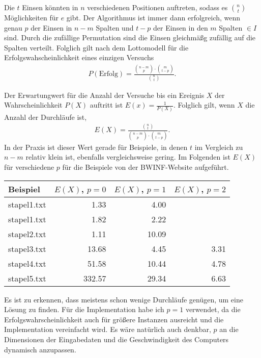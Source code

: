 \documentclass[a4paper,10pt,ngerman]{scrartcl}
\begin{document}
Die $t$ Einsen könnten in $n$ verschiedenen Positionen auftreten, sodass es $\binom{n}{t}$ Möglichkeiten für $e$ gibt. Der Algorithmus ist immer dann erfolgreich, wenn genau $p$ der Einsen in $n-m$ Spalten und $t-p$ der Einsen in den $m$ Spalten $\in I$ sind. Durch die zufällige Permutation sind die Einsen gleichmäßg zufällig auf die Spalten verteilt. Folglich gilt nach dem Lottomodell für die Erfolgswahscheinlichkeit eines einzigen Versuchs
\begin{align*}
    P(\text{Erfolg}) = \frac{\binom{n-m}{p} \cdot \binom{m}{t-p}}{\binom{n}{t}}.
\end{align*}

Der Erwartungwert für die Anzahl der Versuche bis ein Ereignis $X$ der Wahrscheinlichkeit $P(X)$ auftritt ist $E(x) = \frac{1}{P(X)}$.
Folglich gilt, wenn $X$ die Anzahl der Durchläufe ist,
\begin{align*}
    E(X) = \frac{\binom{n}{t}}{\binom{n-m}{p} \cdot \binom{m}{t-p}}.
\end{align*} 
In der Praxis ist dieser Wert gerade für Beispiele, in denen $t$ im Vergleich zu $n-m$ relativ klein ist, ebenfalls vergleichsweise gering. 
Im Folgenden ist $E(X)$ für verschiedene $p$ für die Beispiele von der BWINF-Website aufgeführt.
\begin{table}[H]
    \centering
    \begin{tabular}{lrrr}
        \toprule
    
        Beispiel & $E(X)$, $p=0$ & $E(X)$, $p=1$ & $E(X)$, $p=2$ \\\midrule
        stapel1.txt &1.33	&4.00 &  \\
        stapel1.txt &1.82&	2.22&  \\
        stapel2.txt &1.11	&10.09&  \\
    stapel3.txt &13.68&	4.45&	3.31 \\
    stapel4.txt	&51.58&	10.44	&4.78 \\
    stapel5.txt	&332.57	&29.34&	6.63\\\bottomrule
    \end{tabular}
\end{table}
Es ist zu erkennen, dass meistens schon wenige Durchläufe genügen, um eine Lösung zu finden. 
Für die Implementation habe ich $p=1$ verwendet, da die Erfolgswahrscheinlichkeit auch für größere Instanzen ausreicht und die Implementation vereinfacht wird. Es wäre natürlich auch denkbar, $p$ an die Dimensionen der Eingabedaten und die Geschwindigkeit des Computers dynamisch anzupassen.
\end{document}
